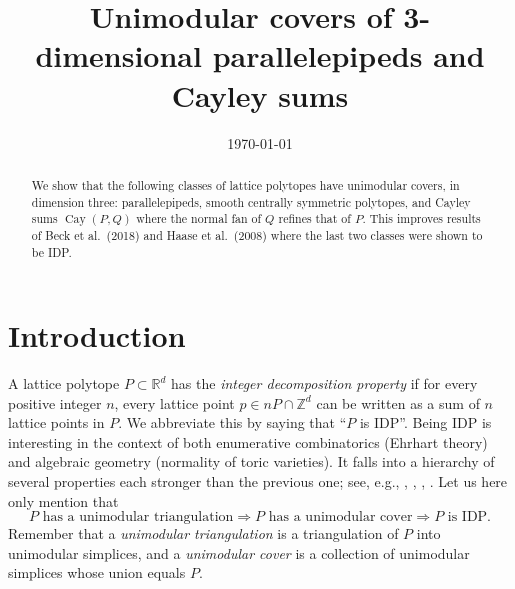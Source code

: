 \documentclass{amsart}
\date{\today}
\title{Unimodular covers of 3-dimensional parallelepipeds and Cayley sums}
\author{}
\theoremstyle{plain}
\theoremstyle{definition}
\newcommand{\Z}{ \ensuremath{\mathbb{Z}}}
\newcommand{\R}{ \ensuremath{\mathbb{R}}}
\newcommand{\cayley}{\operatorname{Cay}}
\begin{document}
\begin{abstract}
We show that the following classes of lattice polytopes have unimodular covers, in dimension three:  parallelepipeds,  smooth centrally symmetric polytopes, and  Cayley sums $\cayley(P,Q)$ where the normal fan of $Q$ refines that of $P$. This improves results of Beck et al.~(2018) and Haase et al.~(2008) where the last two classes were shown to be IDP.
\end{abstract}

\maketitle


\section{Introduction}

A lattice polytope $P\subset \R^d$ has the \emph{integer decomposition property} if for every positive integer $n$, every lattice point $p \in nP\cap \Z^d$ can be written as a sum of $n$ lattice points in $P$. We abbreviate this by saying that ``$P$ is IDP''. Being IDP is interesting in the context of  both enumerative combinatorics (Ehrhart theory) and algebraic geometry (normality of toric varieties). It falls into a hierarchy of several properties each stronger than the previous one; see, e.g., \cite[Section 2.D]{BGbook}, \cite[Sect. 1.2.5]{HPPS-survey}, \cite[p. 2097]{mfo2004}, \cite[p. 2313]{mfo2007}.
Let us here only mention that
\[
P \text{ has a unimodular triangulation}\Rightarrow
P \text{ has a unimodular cover}\Rightarrow
P \text{ is IDP.}
\]
Remember that a \emph{unimodular triangulation} is a triangulation of $P$ into unimodular simplices, and a \emph{unimodular cover} is a collection of unimodular simplices whose union equals $P$. 
\end{document}

